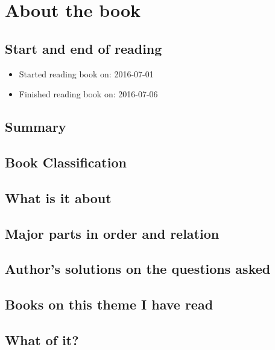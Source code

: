 \documentclass[12pt]{article}
\begin{document}
\maketitle

\newpage
\tableofcontents

\section{About the book}

\subsection{Start and end of reading}
\begin{itemize}
\item{Started reading book on: 2016-07-01}
\item{Finished reading book on: 2016-07-06}
\end{itemize}

\subsection{Summary}

\subsection{Book Classification}

\subsection{What is it about}

\subsection{Major parts in order and relation}

\subsection{Author's solutions on the questions asked}

\subsection{Books on this theme I have read}

\subsection{What of it?}
\end{document}
